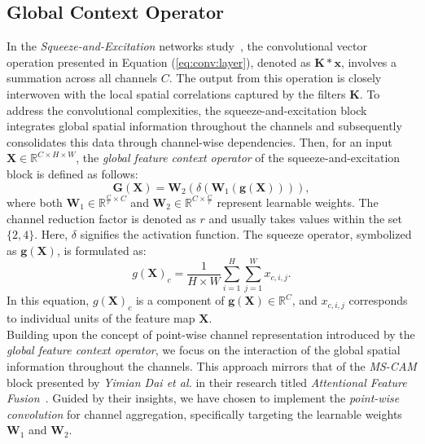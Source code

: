 \subsection{Global Context Operator}
In the \textit{Squeeze-and-Excitation} networks study~\cite{DBLP:journals/corr/abs-1709-01507}, the convolutional vector operation presented in Equation (\ref{eq:conv:layer}), denoted as $\boldsymbol{K}*\boldsymbol{x}$, involves a summation across all channels \( C \). The output from this operation is closely interwoven with the local spatial correlations captured by the filters \( \boldsymbol{K} \).
To address the convolutional complexities, the squeeze-and-excitation block integrates global spatial information throughout the channels and subsequently consolidates this data through channel-wise dependencies. Then, for an input \( \mathbf{X} \in \mathbb{R}^{C \times H \times W} \), the \textit{global feature context operator} of the squeeze-and-excitation block is defined as follows:
\begin{equation}
\mathbf{G}(\mathbf{X})=\mathbf{W}_2\left(\delta\left(\mathbf{W}_1(\mathbf{g}(\mathbf{X}))\right)\right),
\end{equation}
where both \(\mathbf{W}_1 \in \mathbb{R}^{\frac{C}{r} \times C}\) and \(\mathbf{W}_2 \in \mathbb{R}^{C \times \frac{C}{r}}\) represent learnable weights. The channel reduction factor is denoted as \(r\) and usually takes values within the set \(\{2,4\}\). Here, \(\delta\) signifies the activation function. The squeeze operator, symbolized as \(\mathbf{g}(\mathbf{X})\), is formulated as:
\begin{equation}
g(\mathbf{X})_c=\frac{1}{H \times W} \sum_{i=1}^H \sum_{j=1}^W x_{c,i,j}.
\end{equation}
In this equation, \(g(\mathbf{X})_c\) is a component of \(\mathbf{g}(\mathbf{X}) \in \mathbb{R}^{C}\), and \(x_{c,i,j}\) corresponds to individual units of the feature map \(\mathbf{X}\).\\

Building upon the concept of point-wise channel representation introduced by the \textit{global feature context operator}, we focus on the interaction of the global spatial information throughout the channels. This approach mirrors that of the \textit{MS-CAM} block presented by \textit{Yimian Dai et al.} in their research titled \textit{Attentional Feature Fusion}~\cite{DBLP:journals/corr/abs-2009-14082}. Guided by their insights, we have chosen to implement the \textit{point-wise convolution} for channel aggregation, specifically targeting the learnable weights \( \mathbf{W}_1 \) and \( \mathbf{W}_2 \). 

